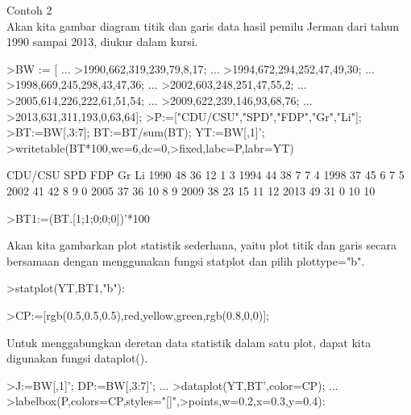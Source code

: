 \documentclass{article}
\begin{document}
\begin{eulernotebook}
\begin{eulercomment}
\begin{eulercomment}
\begin{eulercomment}
Contoh 2\\
Akan kita gambar diagram titik dan garis data hasil pemilu Jerman dari
tahun 1990 sampai 2013, diukur dalam kursi.
\end{eulercomment}
\begin{eulerprompt}
>BW := [ ...
>1990,662,319,239,79,8,17; ...
>1994,672,294,252,47,49,30; ...
>1998,669,245,298,43,47,36; ...
>2002,603,248,251,47,55,2; ...
>2005,614,226,222,61,51,54; ...
>2009,622,239,146,93,68,76; ...
>2013,631,311,193,0,63,64];
>P:=["CDU/CSU","SPD","FDP","Gr","Li"]; 
>BT:=BW[,3:7]; BT:=BT/sum(BT); YT:=BW[,1]';
>writetable(BT*100,wc=6,dc=0,>fixed,labc=P,labr=YT)
\end{eulerprompt}
\begin{euleroutput}
         CDU/CSU   SPD   FDP    Gr    Li
    1990      48    36    12     1     3
    1994      44    38     7     7     4
    1998      37    45     6     7     5
    2002      41    42     8     9     0
    2005      37    36    10     8     9
    2009      38    23    15    11    12
    2013      49    31     0    10    10
\end{euleroutput}
\begin{eulerprompt}
>BT1:=(BT.[1;1;0;0;0])'*100
\end{eulerprompt}
\begin{euleroutput}
  [84.29,  81.25,  81.1659,  82.7529,  72.9642,  61.8971,  79.8732]
\end{euleroutput}
\begin{eulercomment}
Akan kita gambarkan plot statistik sederhana, yaitu plot titik dan
garis secara bersamaan dengan menggunakan fungsi statplot dan pilih
plottype="b".
\end{eulercomment}
\begin{eulerprompt}
>statplot(YT,BT1,"b"):
\end{eulerprompt}
\begin{eulerprompt}
>CP:=[rgb(0.5,0.5,0.5),red,yellow,green,rgb(0.8,0,0)];
\end{eulerprompt}
\begin{eulercomment}
Untuk menggabungkan deretan data statistik dalam satu plot, dapat kita
digunakan fungsi dataplot().
\end{eulercomment}
\begin{eulerprompt}
>J:=BW[,1]'; DP:=BW[,3:7]'; ...
>dataplot(YT,BT',color=CP);  ...
>labelbox(P,colors=CP,styles="[]",>points,w=0.2,x=0.3,y=0.4):
\end{eulerprompt}

\end{eulercomment}
\end{eulercomment}
\end{eulernotebook}
\end{document}
